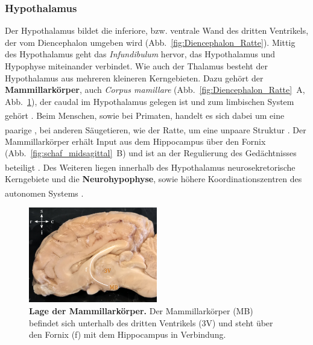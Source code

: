 \documentclass[12pt,a4paper,pdftex]{article}
\begin{document}
\subsubsection{Hypothalamus}
\label{subsubsec:Hypothalamus} 

Der Hypothalamus bildet die inferiore, bzw. ventrale Wand des dritten Ventrikels, der vom Diencephalon umgeben wird (Abb.~\ref{fig:Diencephalon_Ratte}). Mittig des Hypothalamus geht das \textit{Infundibulum} hervor, das Hypothalamus und Hypophyse miteinander verbindet. Wie auch der Thalamus besteht der Hypothalamus aus mehreren kleineren Kerngebieten. Dazu gehört der \textbf{Mammillarkörper}, auch \textit{Corpus mamillare} (Abb.~\ref{fig:Diencephalon_Ratte}~A, Abb.~\ref{fig:schaf_MB}), der caudal im Hypothalamus gelegen ist und zum limbischen System gehört \textsuperscript{\cite[16]{crossman2014neuroanatomy}}. Beim Menschen, sowie bei Primaten, handelt es sich dabei um eine paarige \textsuperscript{\cite[7]{crossman2014neuroanatomy}}, bei anderen Säugetieren, wie der Ratte, um eine unpaare Struktur \textsuperscript{\cite[13]{paxinos2014rat}}. Der Mammillarkörper erhält Input aus dem Hippocampus über den Fornix (Abb.~\ref{fig:schaf_midsagittal}~B) und ist an der Regulierung des Gedächtnisses beteiligt \textsuperscript{\cite[7]{neurowissenschaften_baer}}. Des Weiteren liegen innerhalb des Hypothalamus neurosekretorische Kerngebiete und die \textbf{Neurohypophyse}, sowie höhere Koordinationszentren des autonomen Systems \textsuperscript{\cite[6]{storch2012lehrbuchzoo}}.

\begin{figure}[H]
    \centering
    \includegraphics[width=0.5\textwidth]{pictures/Bilder_Jule/Schaf/Ausschnitte/MB.png}
    \caption[Lage der Mammillarkörper]{\textbf{Lage der Mammillarkörper.} Der Mammillarkörper (MB) befindet sich unterhalb des dritten Ventrikels (3V) und steht über den Fornix (f) mit dem Hippocampus in Verbindung.}
    \label{fig:schaf_MB}
\end{figure}{}
\end{document}
